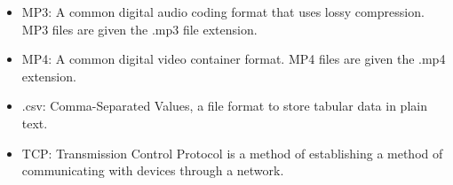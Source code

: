 \documentclass[onecolumn, draftclsnofoot,10pt, compsoc]{IEEEtran}
\begin{document}
\begin{itemize}
	\item MP3: A common digital audio coding format that uses lossy compression. MP3 files are given the .mp3 file extension.

	\item MP4: A common digital video container format. MP4 files are given the .mp4 extension. 

	\item .csv: Comma-Separated Values, a file format to store tabular data in plain text.

	\item TCP: Transmission Control Protocol is a method of establishing a method of communicating with devices through a network. 

\end{itemize}
\end{document}
